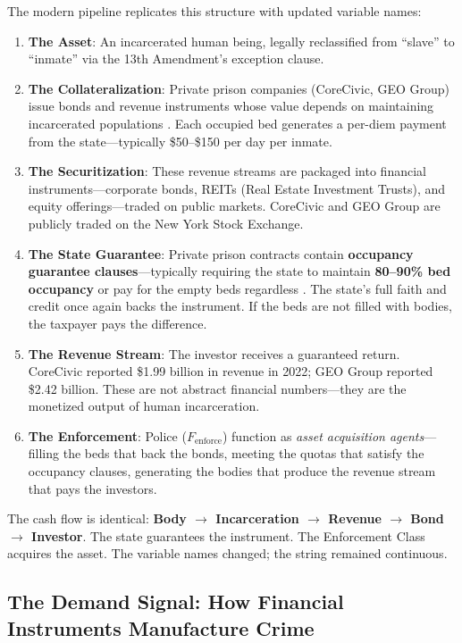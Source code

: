 The modern pipeline replicates this structure with updated variable names:

\begin{enumerate}
    \item \textbf{The Asset}: An incarcerated human being, legally reclassified from ``slave'' to ``inmate'' via the 13th Amendment's exception clause.
    \item \textbf{The Collateralization}: Private prison companies (CoreCivic, GEO Group) issue bonds and revenue instruments whose value depends on maintaining incarcerated populations \cite{alexander}. Each occupied bed generates a per-diem payment from the state---typically \$50--\$150 per day per inmate.
    \item \textbf{The Securitization}: These revenue streams are packaged into financial instruments---corporate bonds, REITs (Real Estate Investment Trusts), and equity offerings---traded on public markets. CoreCivic and GEO Group are publicly traded on the New York Stock Exchange.
    \item \textbf{The State Guarantee}: Private prison contracts contain \textbf{occupancy guarantee clauses}---typically requiring the state to maintain \textbf{80--90\% bed occupancy} or pay for the empty beds regardless \cite{itpi}. The state's full faith and credit once again backs the instrument. If the beds are not filled with bodies, the taxpayer pays the difference.
    \item \textbf{The Revenue Stream}: The investor receives a guaranteed return. CoreCivic reported \$1.99 billion in revenue in 2022; GEO Group reported \$2.42 billion. These are not abstract financial numbers---they are the monetized output of human incarceration.
    \item \textbf{The Enforcement}: Police ($F_{\text{enforce}}$) function as \textit{asset acquisition agents}---filling the beds that back the bonds, meeting the quotas that satisfy the occupancy clauses, generating the bodies that produce the revenue stream that pays the investors.
\end{enumerate}

The cash flow is identical: \textbf{Body $\rightarrow$ Incarceration $\rightarrow$ Revenue $\rightarrow$ Bond $\rightarrow$ Investor}. The state guarantees the instrument. The Enforcement Class acquires the asset. The variable names changed; the string remained continuous.

\subsection{The Demand Signal: How Financial Instruments Manufacture Crime}

